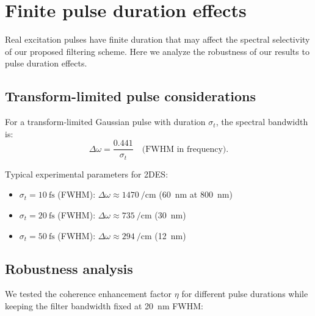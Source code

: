\documentclass[11pt,a4paper]{article}
\begin{document}

\section{Finite pulse duration effects}
\label{sec:S8}

Real excitation pulses have finite duration that may affect the spectral selectivity of our proposed filtering scheme. Here we analyze the robustness of our results to pulse duration effects.

\subsection{Transform-limited pulse considerations}

For a transform-limited Gaussian pulse with duration $\sigma_t$, the spectral bandwidth is:
\begin{equation}
\Delta\omega = \frac{0.441}{\sigma_t} \quad \text{(FWHM in frequency)}.
\label{eq:transform_limit}
\end{equation}

Typical experimental parameters for 2DES:
\begin{itemize}
    \item $\sigma_t = \SI{10}{\femto\second}$ (FWHM): $\Delta\omega \approx \SI{1470}{\per\centi\meter}$ (\SI{60}{\nano\meter} at \SI{800}{\nano\meter})
    \item $\sigma_t = \SI{20}{\femto\second}$ (FWHM): $\Delta\omega \approx \SI{735}{\per\centi\meter}$ (\SI{30}{\nano\meter})
    \item $\sigma_t = \SI{50}{\femto\second}$ (FWHM): $\Delta\omega \approx \SI{294}{\per\centi\meter}$ (\SI{12}{\nano\meter})
\end{itemize}

\subsection{Robustness analysis}

We tested the coherence enhancement factor $\eta$ for different pulse durations while keeping the filter bandwidth fixed at \SI{20}{\nano\meter} FWHM:
\end{document}
